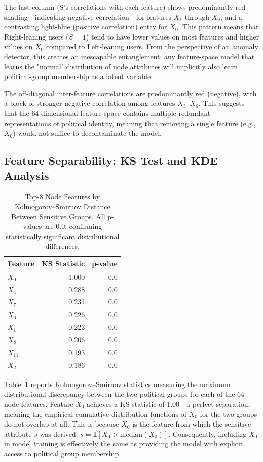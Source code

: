 \documentclass[sigconf,natbib=false]{acmart}
\begin{document}
The last column (S's correlations with each feature) shows predominantly red shading—indicating negative correlation—for features $X_1$ through $X_9$, and a contrasting light-blue (positive correlation) entry for $X_0$. This pattern means that Right-leaning users ($S=1$) tend to have lower values on most features and higher values on $X_0$ compared to Left-leaning users. From the perspective of an anomaly detector, this creates an inescapable entanglement: any feature-space model that learns the "normal" distribution of node attributes will implicitly also learn political-group membership as a latent variable.

The off-diagonal inter-feature correlations are predominantly red (negative), with a block of stronger negative correlation among features $X_3$–$X_6$. This suggests that the 64-dimensional feature space contains multiple redundant representations of political identity, meaning that removing a single feature (e.g., $X_0$) would not suffice to decontaminate the model.

\subsection{Feature Separability: KS Test and KDE Analysis}

\begin{table}[h]
\centering
\caption{Top-8 Node Features by Kolmogorov–Smirnov Distance Between Sensitive Groups. All p-values are 0.0, confirming statistically significant distributional differences.}
\label{tab:ks-top8}
\begin{tabular}{lrr}
\toprule
\textbf{Feature} & \textbf{KS Statistic} & \textbf{p-value} \\
\midrule
$X_0$    & 1.000 & 0.0 \\
$X_4$    & 0.288 & 0.0 \\
$X_7$    & 0.231 & 0.0 \\
$X_6$    & 0.226 & 0.0 \\
$X_1$    & 0.223 & 0.0 \\
$X_8$    & 0.206 & 0.0 \\
$X_{11}$ & 0.193 & 0.0 \\
$X_2$    & 0.186 & 0.0 \\
\bottomrule
\end{tabular}
\end{table}

Table~\ref{tab:ks-top8} reports Kolmogorov–Smirnov statistics measuring the maximum distributional discrepancy between the two political groups for each of the 64 node features. Feature $X_0$ achieves a KS statistic of 1.00—a perfect separation, meaning the empirical cumulative distribution functions of $X_0$ for the two groups do not overlap at all. This is because $X_0$ is the feature from which the sensitive attribute $s$ was derived: $s = \mathbf{1}[X_0 > \text{median}(X_0)]$. Consequently, including $X_0$ in model training is effectively the same as providing the model with explicit access to political group membership.
\end{document}
